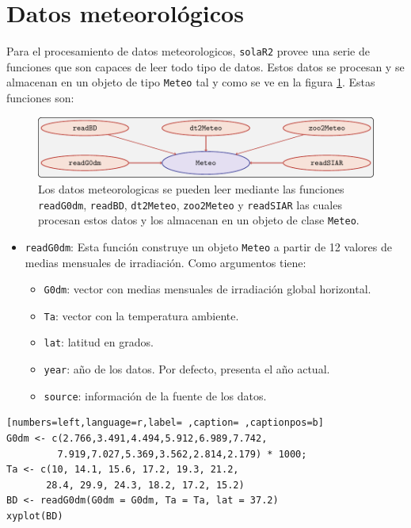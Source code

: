 \section{Datos meteorológicos}
\label{sec:org92e7255}
\label{sec:datos-meteorologicos}
Para el procesamiento de datos meteorologicos, \texttt{solaR2} provee una serie de funciones que son capaces de leer todo tipo de datos. Estos datos se procesan y se almacenan en un objeto de tipo \texttt{Meteo} tal y como se ve en la figura \ref{fig:meteo}. Estas funciones son:
\begin{figure}[!htb]
\centering
\includegraphics[keepaspectratio,width=\textwidth,height=0.8\textheight]{figuras/meteo.pdf}
\caption{Los datos meteorologicas se pueden leer mediante las funciones \texttt{readG0dm}, \texttt{readBD}, \texttt{dt2Meteo}, \texttt{zoo2Meteo} y \texttt{readSIAR} las cuales procesan estos datos y los almacenan en un objeto de clase \texttt{Meteo}. \label{fig:meteo}}
\end{figure}
\begin{itemize}
\item \texttt{readG0dm}: Esta función construye un objeto \texttt{Meteo} a partir de 12 valores de medias mensuales de irradiación.
Como argumentos tiene:
\begin{itemize}
\item \texttt{G0dm}: vector con medias mensuales de irradiación global horizontal.
\item \texttt{Ta}: vector con la temperatura ambiente.
\item \texttt{lat}: latitud en grados.
\item \texttt{year}: año de los datos. Por defecto, presenta el año actual.
\item \texttt{source}: información de la fuente de los datos.
\end{itemize}
\end{itemize}
\begin{lstlisting}[numbers=left,language=r,label= ,caption= ,captionpos=b]
G0dm <- c(2.766,3.491,4.494,5.912,6.989,7.742,
         7.919,7.027,5.369,3.562,2.814,2.179) * 1000;
Ta <- c(10, 14.1, 15.6, 17.2, 19.3, 21.2,
       28.4, 29.9, 24.3, 18.2, 17.2, 15.2)
BD <- readG0dm(G0dm = G0dm, Ta = Ta, lat = 37.2)
xyplot(BD)
\end{lstlisting}


